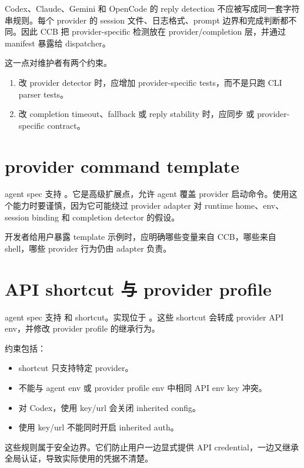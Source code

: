 Codex、Claude、Gemini 和 OpenCode 的 reply detection 不应被写成同一套字符串规则。每个 provider 的 session 文件、日志格式、prompt 边界和完成判断都不同。因此 CCB 把 provider-specific 检测放在 provider/completion 层，并通过 manifest 暴露给 dispatcher。

这一点对维护者有两个约束。

\begin{enumerate}
  \item 改 provider detector 时，应增加 provider-specific tests，而不是只跑 CLI parser tests。
  \item 改 completion timeout、fallback 或 reply stability 时，应同步  或 provider-specific contract。
\end{enumerate}

\section{provider command template}

agent spec 支持 。它是高级扩展点，允许 agent 覆盖 provider 启动命令。使用这个能力时要谨慎，因为它可能绕过 provider adapter 对 runtime home、env、session binding 和 completion detector 的假设。

开发者给用户暴露 template 示例时，应明确哪些变量来自 CCB，哪些来自 shell，哪些 provider 行为仍由 adapter 负责。

\section{API shortcut 与 provider profile}

agent spec 支持  和  shortcut。实现位于 。这些 shortcut 会转成 provider API env，并修改 provider profile 的继承行为。

约束包括：

\begin{itemize}
  \item shortcut 只支持特定 provider。
  \item 不能与 agent env 或 provider profile env 中相同 API env key 冲突。
  \item 对 Codex，使用 key/url 会关闭 inherited config。
  \item 使用 key/url 不能同时开启 inherited auth。
\end{itemize}

这些规则属于安全边界。它们防止用户一边显式提供 API credential，一边又继承全局认证，导致实际使用的凭据不清楚。

